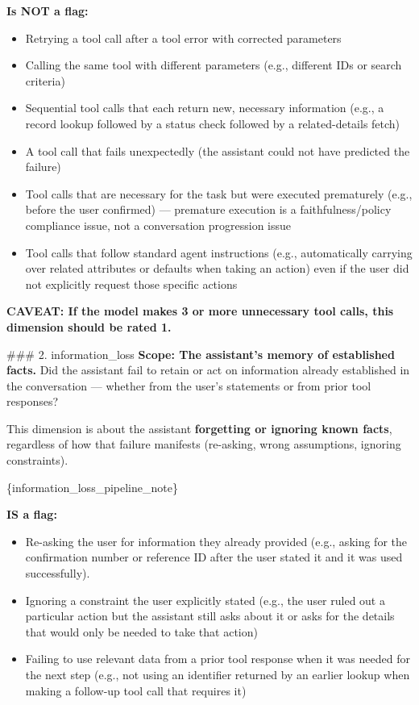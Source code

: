 \begin{tcolorbox}[promptbox, title={\small Conversation Progression Prompt}]
      \textbf{Is NOT a flag:}
      \begin{itemize}
        \item Retrying a tool call after a tool error with corrected parameters
        \item Calling the same tool with different parameters (e.g., different IDs or search criteria)
        \item Sequential tool calls that each return new, necessary information (e.g., a record lookup followed by a status check followed by a related-details fetch)
        \item A tool call that fails unexpectedly (the assistant could not have predicted the failure)
        \item Tool calls that are necessary for the task but were executed prematurely (e.g., before the user confirmed) --- premature execution is a faithfulness/policy compliance issue, not a conversation progression issue
        \item Tool calls that follow standard agent instructions (e.g., automatically carrying over related attributes or defaults when taking an action) even if the user did not explicitly request those specific actions
      \end{itemize}

      \textbf{CAVEAT: If the model makes 3 or more unnecessary tool calls, this dimension should be rated 1.}\newline

      \#\#\# 2. information\_loss\newline
      \textbf{Scope: The assistant's memory of established facts.} Did the assistant fail to retain or act on information already established in the conversation --- whether from the user's statements or from prior tool responses?\newline

      This dimension is about the assistant \textbf{forgetting or ignoring known facts}, regardless of how that failure manifests (re-asking, wrong assumptions, ignoring constraints).\newline

      \{information\_loss\_pipeline\_note\}\newline

      \textbf{IS a flag:}
      \begin{itemize}
        \item Re-asking the user for information they already provided (e.g., asking for the confirmation number or reference ID after the user stated it and it was used successfully).
        \item Ignoring a constraint the user explicitly stated (e.g., the user ruled out a particular action but the assistant still asks about it or asks for the details that would only be needed to take that action)
        \item Failing to use relevant data from a prior tool response when it was needed for the next step (e.g., not using an identifier returned by an earlier lookup when making a follow-up tool call that requires it)
      \end{itemize}


\end{tcolorbox}
